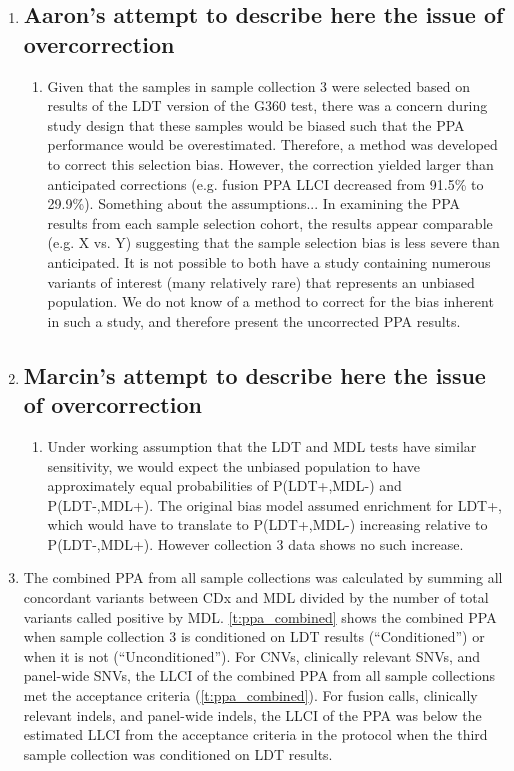\begin{enumerate}
	\item \subsection{Aaron's attempt to describe here the issue of overcorrection}
	\begin{enumerate}
    \item Given that the samples in
    sample collection 3 were selected based on results of the LDT version of the G360 test, there
    was a concern during study design that these samples would be biased such that the PPA
    performance would be overestimated. Therefore, a method was developed to correct this selection
    bias. However, the correction yielded larger than anticipated corrections (e.g. fusion PPA LLCI
    decreased from 91.5\% to 29.9\%). Something about the assumptions... In examining the PPA
    results from each sample selection cohort, the results appear comparable (e.g. X vs. Y)
    suggesting that the sample selection bias is less severe than anticipated. It is not possible
    to both have a study containing numerous variants of interest (many relatively rare) that
    represents an unbiased population. We do not know of a method to correct for the bias inherent
    in such a study, and therefore present the uncorrected PPA results.
    \end{enumerate}

	\item \subsection{Marcin's attempt to describe here the issue of overcorrection}
	\begin{enumerate}
    \item Under working assumption that the LDT and MDL tests have similar sensitivity,
    we would expect the unbiased population to have approximately equal probabilities of
    P(LDT+,MDL-) and P(LDT-,MDL+). The original bias model assumed enrichment for LDT+,
    which would have to translate to P(LDT+,MDL-) increasing relative to P(LDT-,MDL+).
    However collection 3 data shows no such increase.
    \end{enumerate}
    
    \item The combined PPA from all sample collections was calculated by summing
      all concordant variants between CDx and MDL divided by the number of total variants
      called positive by MDL. \cref{t:ppa_combined} shows the combined PPA when sample
      collection 3 is conditioned on LDT results (``Conditioned'') or when it is not
      (``Unconditioned'').  For CNVs, clinically relevant SNVs, and panel-wide SNVs, the
      LLCI of the combined PPA from all sample collections met the acceptance criteria
      (\cref{t:ppa_combined}).  For fusion calls, clinically relevant indels, and
      panel-wide indels, the LLCI of the PPA was below the estimated LLCI from the
      acceptance criteria in the protocol when the third sample collection was conditioned
      on LDT results.
      

\end{enumerate}
